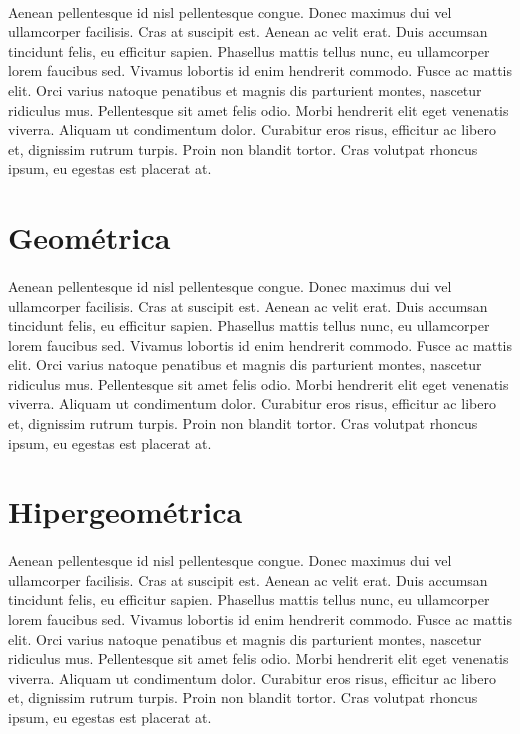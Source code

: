 \documentclass[a4paper,12pt]{article}
\begin{document}
\paragraph{}
Aenean pellentesque id nisl pellentesque congue. Donec maximus dui vel
ullamcorper facilisis. Cras at suscipit est. Aenean ac velit
erat. Duis accumsan tincidunt felis, eu efficitur sapien. Phasellus
mattis tellus nunc, eu ullamcorper lorem faucibus sed. Vivamus
lobortis id enim hendrerit commodo. Fusce ac mattis elit. Orci varius
natoque penatibus et magnis dis parturient montes, nascetur ridiculus
mus. Pellentesque sit amet felis odio. Morbi hendrerit elit eget
venenatis viverra. Aliquam ut condimentum dolor. Curabitur eros risus,
efficitur ac libero et, dignissim rutrum turpis. Proin non blandit
tortor. Cras volutpat rhoncus ipsum, eu egestas est placerat at.

\section{Geométrica}

\paragraph{}
Aenean pellentesque id nisl pellentesque congue. Donec maximus dui vel
ullamcorper facilisis. Cras at suscipit est. Aenean ac velit
erat. Duis accumsan tincidunt felis, eu efficitur sapien. Phasellus
mattis tellus nunc, eu ullamcorper lorem faucibus sed. Vivamus
lobortis id enim hendrerit commodo. Fusce ac mattis elit. Orci varius
natoque penatibus et magnis dis parturient montes, nascetur ridiculus
mus. Pellentesque sit amet felis odio. Morbi hendrerit elit eget
venenatis viverra. Aliquam ut condimentum dolor. Curabitur eros risus,
efficitur ac libero et, dignissim rutrum turpis. Proin non blandit
tortor. Cras volutpat rhoncus ipsum, eu egestas est placerat at.

\section{Hipergeométrica}

\paragraph{}
Aenean pellentesque id nisl pellentesque congue. Donec maximus dui vel
ullamcorper facilisis. Cras at suscipit est. Aenean ac velit
erat. Duis accumsan tincidunt felis, eu efficitur sapien. Phasellus
mattis tellus nunc, eu ullamcorper lorem faucibus sed. Vivamus
lobortis id enim hendrerit commodo. Fusce ac mattis elit. Orci varius
natoque penatibus et magnis dis parturient montes, nascetur ridiculus
mus. Pellentesque sit amet felis odio. Morbi hendrerit elit eget
venenatis viverra. Aliquam ut condimentum dolor. Curabitur eros risus,
efficitur ac libero et, dignissim rutrum turpis. Proin non blandit
tortor. Cras volutpat rhoncus ipsum, eu egestas est placerat at.
\end{document}

